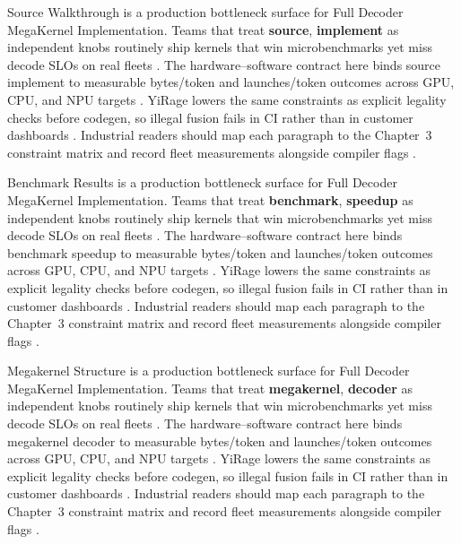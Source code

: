 Source Walkthrough is a production bottleneck surface for Full Decoder MegaKernel Implementation. Teams that treat \textbf{source}, \textbf{implement} as independent knobs routinely ship kernels that win microbenchmarks yet miss decode SLOs on real fleets \citep{memoryfloor2026,amd2024xdna}. The hardware--software contract here binds source implement to measurable bytes/token and launches/token outcomes across GPU, CPU, and NPU targets \citep{nvidia2022hopper,amd2024aie}. YiRage lowers the same constraints as explicit legality checks before codegen, so illegal fusion fails in CI rather than in customer dashboards \citep{semianalysis2024tma,dlbook}. Industrial readers should map each paragraph to the Chapter~3 constraint matrix and record fleet measurements alongside compiler flags \citep{amd2024xdna,dao2022flashattention}.

Benchmark Results is a production bottleneck surface for Full Decoder MegaKernel Implementation. Teams that treat \textbf{benchmark}, \textbf{speedup} as independent knobs routinely ship kernels that win microbenchmarks yet miss decode SLOs on real fleets \citep{nvidia2022hopper,amd2024aie}. The hardware--software contract here binds benchmark speedup to measurable bytes/token and launches/token outcomes across GPU, CPU, and NPU targets \citep{semianalysis2024tma,dlbook}. YiRage lowers the same constraints as explicit legality checks before codegen, so illegal fusion fails in CI rather than in customer dashboards \citep{amd2024xdna,dao2022flashattention}. Industrial readers should map each paragraph to the Chapter~3 constraint matrix and record fleet measurements alongside compiler flags \citep{amd2024aie,kwon2023vllm}.

Megakernel Structure is a production bottleneck surface for Full Decoder MegaKernel Implementation. Teams that treat \textbf{megakernel}, \textbf{decoder} as independent knobs routinely ship kernels that win microbenchmarks yet miss decode SLOs on real fleets \citep{semianalysis2024tma,dlbook}. The hardware--software contract here binds megakernel decoder to measurable bytes/token and launches/token outcomes across GPU, CPU, and NPU targets \citep{amd2024xdna,dao2022flashattention}. YiRage lowers the same constraints as explicit legality checks before codegen, so illegal fusion fails in CI rather than in customer dashboards \citep{amd2024aie,kwon2023vllm}. Industrial readers should map each paragraph to the Chapter~3 constraint matrix and record fleet measurements alongside compiler flags \citep{dlbook,nvidia2024cudagraphs}.

